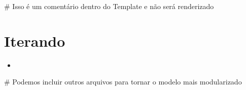 \documentclass[12pt,a4paper]{article}
\newcommand{\VAR}[1]{}
\newcommand{\BLOCK}[1]{}
\begin{document}
\#{ Isso é um comentário dentro do Template e não será renderizado }
\section{Iterando}
\begin{itemize}
\BLOCK{ for i in range(10) } 
    \item \VAR{i**2-1}
\BLOCK{ endfor }
\end{itemize}

\#{ Podemos incluir outros arquivos para tornar o modelo mais modularizado }
 
\end{document}
